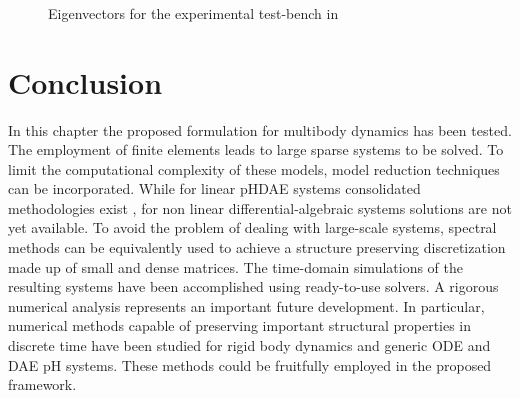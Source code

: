 \begin{figure*}[p]
	\centering
	\hfil
	 \\
	\hfil
	 \\
	\hfil
	 \\
	\caption{Eigenvectors for the experimental test-bench in \cite{preda2020}}
	\label{fig:om_setup}
\end{figure*}


\begin{comment}
Omega full lambda 1: 10.05488286658613
Omega full lambda 2: 32.820440166701395
Omega full lambda 3: 34.841016638952
Omega full lambda 4: 47.23797002941684
Omega full lambda 5: 63.78852519981024
Omega full lambda 6: 117.80124510761422
\end{comment}

\section{Conclusion}


In this chapter the proposed formulation for multibody dynamics has been tested. The employment of finite elements leads to large sparse systems to be solved. To limit the computational complexity of these models, model reduction techniques can be incorporated. While for linear pHDAE systems consolidated methodologies exist \cite{egger2018}, for non linear differential-algebraic systems solutions are not yet available. To avoid the problem of dealing with large-scale systems, spectral methods can be equivalently used to achieve a structure preserving discretization made up of small and dense matrices. 
The time-domain simulations of the resulting systems have been accomplished using ready-to-use solvers. A rigorous numerical analysis represents an important future development. In particular, numerical methods capable of preserving important structural properties in discrete time have been studied for rigid body dynamics \cite{celledoni2018passivity} and generic ODE \cite{kotyczka2019discrete} and DAE \cite{mehrmann2019structurepreserving} pH systems. These methods could be fruitfully employed in the proposed framework. 